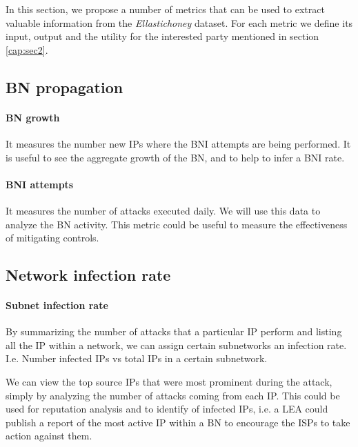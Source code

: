 


In this section, we propose a number of metrics that can be used to extract valuable information from the \textit{Ellastichoney} dataset. For each metric we define its input, output and the utility for the interested party mentioned in section \ref{cap:sec2}.
\indent
\subsection{BN propagation}

    \paragraph{BN growth}It measures the number new IPs where the BNI attempts are being performed. It is useful to see the aggregate growth of the BN, and to help to infer a BNI rate.

    \paragraph{BNI attempts}
    It measures the number of attacks executed daily. We will use this data to analyze the BN activity. This metric could be useful to measure the effectiveness of mitigating controls.

\subsection{Network infection rate}
    \paragraph{Subnet infection rate} By summarizing the number of attacks that a particular IP perform and listing all the IP within a network, we can assign certain subnetworks an infection rate. I.e. Number infected IPs vs total IPs in a certain subnetwork.

    We can view the top source IPs that were most prominent during the attack, simply by analyzing the number of attacks coming from each IP. This could be used for reputation analysis and to identify of infected IPs, i.e. a LEA could publish a report of the most active IP within a BN to encourage the ISPs to take action against them.

